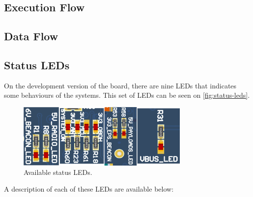 \subsection{Execution Flow}

\subsection{Data Flow}

\subsection{Status LEDs} \label{sec:status-leds}

On the development version of the board, there are nine LEDs that indicates some behaviours of the systems. This set of LEDs can be seen on \autoref{fig:status-leds}.

\begin{figure}[!ht]
    \begin{center}
        \includegraphics[width=0.75\textwidth]{figures/status_leds.png}
        \caption{Available status LEDs.}
        \label{fig:status-leds}
    \end{center}
\end{figure}

A description of each of these LEDs are available below:


